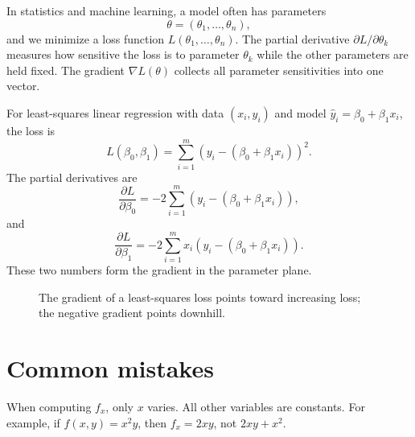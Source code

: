 \documentclass[11pt]{article}
\newcommand{\grad}{\nabla}
\begin{document}
In statistics and machine learning, a model often has parameters
\[
\theta=(\theta_1,\ldots,\theta_n),
\]
and we minimize a loss function $L(\theta_1,\ldots,\theta_n)$. The partial derivative $\partial L/\partial \theta_k$ measures how sensitive the loss is to parameter $\theta_k$ while the other parameters are held fixed. The gradient $\grad L(\theta)$ collects all parameter sensitivities into one vector.

For least-squares linear regression with data $(x_i,y_i)$ and model $\widehat y_i=\beta_0+\beta_1x_i$, the loss is
\[
L(\beta_0,\beta_1)=\sum_{i=1}^m \left(y_i-(\beta_0+\beta_1x_i)\right)^2.
\]
The partial derivatives are
\[
\frac{\partial L}{\partial \beta_0}=-2\sum_{i=1}^m\left(y_i-(\beta_0+\beta_1x_i)\right),
\]
and
\[
\frac{\partial L}{\partial \beta_1}=-2\sum_{i=1}^m x_i\left(y_i-(\beta_0+\beta_1x_i)\right).
\]
These two numbers form the gradient in the parameter plane.

\begin{figure}[H]
\centering
{}
\caption{The gradient of a least-squares loss points toward increasing loss; the negative gradient points downhill.}
\end{figure}

\section{Common mistakes}

\begin{warningbox}
When computing $f_x$, only $x$ varies. All other variables are constants. For example, if $f(x,y)=x^2y$, then $f_x=2xy$, not $2xy+x^2$.
\end{warningbox}
\end{document}
